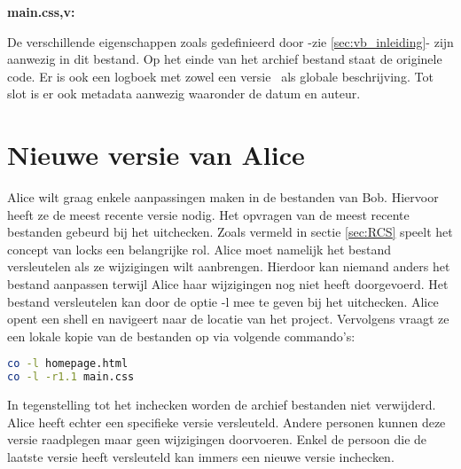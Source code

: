\textbf{main.css,v:}


De verschillende eigenschappen zoals gedefinieerd door \textcite{Loeliger2009} -zie \ref{sec:vb_inleiding}- zijn aanwezig in dit bestand. Op het einde van het archief bestand staat de originele code. Er is ook een logboek met zowel een versie~ als globale beschrijving. Tot slot is er ook metadata aanwezig waaronder de datum en auteur.

\section{Nieuwe versie van Alice}

Alice wilt graag enkele aanpassingen maken in de bestanden van Bob. Hiervoor heeft ze de meest recente versie nodig. Het opvragen van de meest recente bestanden gebeurd bij het uitchecken. Zoals vermeld in sectie \ref{sec:RCS} speelt het concept van locks een belangrijke rol. Alice moet namelijk het bestand versleutelen als ze wijzigingen wilt aanbrengen. Hierdoor kan niemand anders het bestand aanpassen terwijl Alice haar wijzigingen nog niet heeft doorgevoerd. Het bestand versleutelen kan door de optie -l mee te geven bij het uitchecken. Alice opent een shell en navigeert naar de locatie van het project. Vervolgens vraagt ze een lokale kopie van de bestanden op via volgende commando's:

\begin{lstlisting}[language=Bash]
co -l homepage.html
co -l -r1.1 main.css
\end{lstlisting}

In tegenstelling tot het inchecken worden de archief bestanden niet verwijderd. Alice heeft echter een specifieke versie versleuteld. Andere personen kunnen deze versie raadplegen maar geen wijzigingen doorvoeren. Enkel de persoon die de laatste versie heeft versleuteld kan immers een nieuwe versie inchecken.